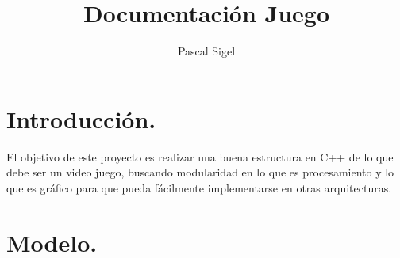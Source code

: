 \documentclass[11pt]{book}
\begin{document}
\title{Documentación Juego}
\author{Pascal Sigel}
\maketitle
\printindex
\chapter{Introducción.}

El objetivo de este proyecto es realizar una buena estructura en C++ de lo que debe ser un video juego, buscando modularidad en lo que es procesamiento y lo que es gráfico para que pueda fácilmente implementarse en otras arquitecturas.

\chapter{Modelo.}
\end{document}
